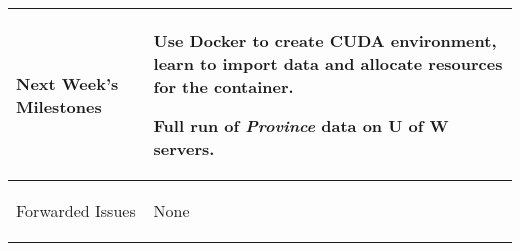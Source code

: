 \documentclass[11pt,letterpaper]{article}
\begin{document}
\begin{tabular}{| p{} | p{} |}
	Next Week's \newline Milestones & \begin{enumerate*}
	\item[\tiny\textbullet] Use Docker to create CUDA environment, learn to import data and allocate resources for the container. \newline
  \item[\tiny\textbullet] Full run of \emph{Province} data on U of W servers.
	\end{enumerate*} \\ \hline

	Forwarded Issues & \begin{enumerate*}
	\item[\tiny\textbullet] None
	\end{enumerate*} \\ \hline
\end{tabular}
\end{document}
